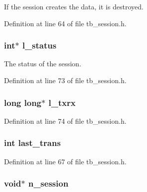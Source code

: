 If the session creates the data, it is destroyed. 



Definition at line 64 of file tb\-\_\-session.\-h.

\hypertarget{structtb__session__t_a22cc288b7e9b2ffe6053aeac5914cb40}{
\subsubsection[{l\-\_\-status}]{\setlength{\rightskip}{0pt plus 5cm}int$\ast$ l\-\_\-status}}\label{structtb__session__t_a22cc288b7e9b2ffe6053aeac5914cb40}


The status of the session. 



Definition at line 73 of file tb\-\_\-session.\-h.

\hypertarget{structtb__session__t_a98701b8da6c02c1671dd748b2251cea7}{
\subsubsection[{l\-\_\-txrx}]{\setlength{\rightskip}{0pt plus 5cm}long long$\ast$ l\-\_\-txrx}}\label{structtb__session__t_a98701b8da6c02c1671dd748b2251cea7}


Definition at line 74 of file tb\-\_\-session.\-h.

\hypertarget{structtb__session__t_ad3547e4d09ba01be9e898cf841504521}{
\subsubsection[{last\-\_\-trans}]{\setlength{\rightskip}{0pt plus 5cm}int last\-\_\-trans}}\label{structtb__session__t_ad3547e4d09ba01be9e898cf841504521}


Definition at line 67 of file tb\-\_\-session.\-h.

\hypertarget{structtb__session__t_ae96f976543c2fbc18fd89a368720f4d4}{
\subsubsection[{n\-\_\-session}]{\setlength{\rightskip}{0pt plus 5cm}void$\ast$ n\-\_\-session}}\label{structtb__session__t_ae96f976543c2fbc18fd89a368720f4d4}


